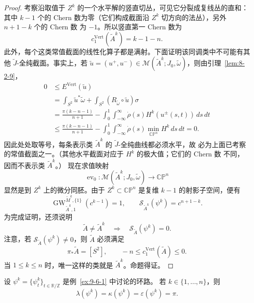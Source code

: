 \begin{proof}
考察沿取值于 $Z^k$ 的一个水平解的竖直切丛，可见它分裂成复线丛的直和：其中 $k-1$
个的 Chern 数为零（它们构成截面沿 $Z^k$ 切方向的法丛），另外 $n+1-k$ 个的 Chern 数
为 $-1$。所以竖直第一 Chern 数为
\[
  c_1^{\mathrm{Vert}}(\widetilde A^k)=k-1-n.
\]
此外，每个这类常值截面的线性化算子都是满射。下面证明该同调类中不可能有其他
$\widetilde J$-全纯截面。事实上，若
$\widetilde u=(u^+,u^-)\in
\mathcal M(\widetilde A^k;J_0,\widetilde\omega)$，则由引理~\ref{lem:8-2-9}，
\[
\begin{aligned}
  0&\le E^{\mathrm{Vert}}(\widetilde u)\\
   &=\int_{S^2}\widetilde u^*\widetilde\omega
     +\int_{S^2}(R_{\widetilde\omega}\circ\widetilde u)\sigma\\
   &=\frac{\pi(k-n-1)}{n+1}
     -\int_0^1\int_{-\infty}^{\infty}
       \dot\rho(s)H^k(u^\pm(s,t))\,ds\,dt\\
   &\le\frac{\pi(k-n-1)}{n+1}
     -\int_0^1\int_{-\infty}^{\infty}
       \dot\rho(s)\min_{\mathbb{CP}^n}H^k\,ds\,dt
    =0.
\end{aligned}
\]
因此处处取等号，每条表示类 $\widetilde A^k$ 的 $\widetilde J$-全纯曲线都必须水平，故
必为上面已考察的常值截面之一。（其他水平截面对应于 $H^k$ 的极大值；它们的 Chern 数
不同，因而不表示类 $\widetilde A^k$。）
现在求值映射
\[
  \operatorname{ev}_0:
  \mathcal M(\widetilde A^k;J_0,\widetilde\omega)
  \longrightarrow\mathbb{CP}^n
\]
显然是到 $Z^k$ 上的微分同胚。由于
$Z^k\subset\mathbb{CP}^n$ 是复维 $k-1$ 的射影子空间，便有
\[
  \operatorname{GW}^{\widetilde M^k,\{1\}}_{\widetilde A^k,1}(c^{k-1})=1,
  \qquad \mathcal S_{\widetilde A^k}(\psi^k)=c^{n+1-k}.
\]
为完成证明，还须说明
\[
  \widetilde A\ne\widetilde A^k
  \quad\Longrightarrow\quad
  \mathcal S_{\widetilde A}(\psi^k)=0.
\]
注意，若 $\mathcal S_{\widetilde A}(\psi^k)\ne0$，则 $\widetilde A$ 必须满足
\[
  \pi_*\widetilde A=[S^2],
  \qquad -n\le c_1^{\mathrm{Vert}}(\widetilde A)\le0.
\]
当 $1\le k\le n$ 时，唯一这样的类就是 $\widetilde A^k$。命题得证。
\end{proof}

\begin{theorem}[Polterovich]\label{thm:9-6-5}
设 $\psi^k=\{\psi_t^k\}_{t\in\mathbb R/\mathbb Z}$ 是例~\ref{ex:9-6-1} 中讨论的环路。
若 $k\in\{1,\ldots,n\}$，则
\[
  \lambda(\psi^k)=\kappa(\psi^k)=\varepsilon(\psi^k)=\pi.
\]
\end{theorem}

